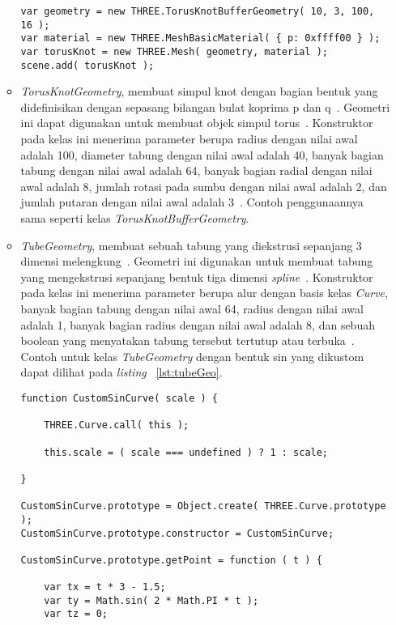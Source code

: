\begin{itemize}
\begin{itemize}
\begin{lstlisting}[caption={Contoh penggunaan kelas {\it TorusKnotBufferGeometry}.}, label={lst:torusKnotBufferGeo},captionpos=b]
var geometry = new THREE.TorusKnotBufferGeometry( 10, 3, 100, 16 );
var material = new THREE.MeshBasicMaterial( { p: 0xffff00 } );
var torusKnot = new THREE.Mesh( geometry, material );
scene.add( torusKnot );
\end{lstlisting}
		\item {\it TorusKnotGeometry}, membuat simpul knot dengan bagian bentuk yang didefinisikan dengan sepasang bilangan bulat koprima p dan q~\cite{threejs}. Geometri ini dapat digunakan untuk membuat objek simpul torus~\cite{learningThreejs}. Konstruktor pada kelas ini menerima parameter berupa radius dengan nilai awal adalah 100, diameter tabung dengan nilai awal adalah 40, banyak bagian tabung dengan nilai awal adalah 64, banyak bagian radial dengan nilai awal adalah 8, jumlah rotasi pada sumbu dengan nilai awal adalah 2, dan jumlah putaran dengan nilai awal adalah 3~\cite{threejs}.  Contoh penggunaannya sama seperti kelas {\it TorusKnotBufferGeometry}.
		\item {\it TubeGeometry}, membuat sebuah tabung yang diekstrusi sepanjang 3 dimensi melengkung~\cite{threejs}. Geometri ini digunakan untuk membuat tabung yang mengekstrusi sepanjang bentuk tiga dimensi {\it spline}~\cite{learningThreejs}. Konstruktor pada kelas ini menerima parameter berupa alur dengan basis kelas {\it Curve}, banyak bagian tabung dengan nilai awal 64, radius dengan nilai awal adalah 1, banyak bagian radius dengan nilai awal adalah 8, dan sebuah boolean yang menyatakan tabung tersebut tertutup atau terbuka~\cite{threejs}. Contoh untuk kelas {\it TubeGeometry} dengan bentuk sin yang dikustom dapat dilihat pada {\it listing} ~\ref{lst:tubeGeo}.
\begin{lstlisting}[caption={Contoh penggunaan kelas {\it TubeGeometry}.}, label={lst:tubeGeo},captionpos=b]
function CustomSinCurve( scale ) {

	THREE.Curve.call( this );

	this.scale = ( scale === undefined ) ? 1 : scale;

}

CustomSinCurve.prototype = Object.create( THREE.Curve.prototype );
CustomSinCurve.prototype.constructor = CustomSinCurve;

CustomSinCurve.prototype.getPoint = function ( t ) {

	var tx = t * 3 - 1.5;
	var ty = Math.sin( 2 * Math.PI * t );
	var tz = 0;


\end{lstlisting}
\end{itemize}
\end{itemize}
